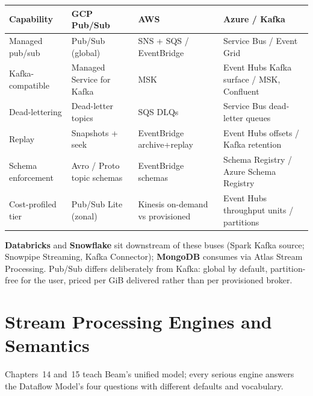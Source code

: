 \begin{center}
\footnotesize
\begin{tabular}{@{}p{2.8cm}p{3.0cm}p{3.0cm}p{3.4cm}@{}}
\toprule
\textbf{Capability} & \textbf{GCP Pub/Sub} & \textbf{AWS} & \textbf{Azure / Kafka} \\
\midrule
Managed pub/sub & Pub/Sub (global) & SNS + SQS / EventBridge & Service Bus / Event Grid \\
Kafka-compatible & Managed Service for Kafka & MSK & Event Hubs Kafka surface / MSK, Confluent \\
Dead-lettering & Dead-letter topics & SQS DLQs & Service Bus dead-letter queues \\
Replay & Snapshots + seek & EventBridge archive+replay & Event Hubs offsets / Kafka retention \\
Schema enforcement & Avro / Proto topic schemas & EventBridge schemas & Schema Registry / Azure Schema Registry \\
Cost-profiled tier & Pub/Sub Lite (zonal) & Kinesis on-demand vs provisioned & Event Hubs throughput units / partitions \\
\bottomrule
\end{tabular}
\end{center}

\noindent \textbf{Databricks} and \textbf{Snowflake} sit downstream of these buses (Spark Kafka
source; Snowpipe Streaming, Kafka Connector); \textbf{MongoDB} consumes via Atlas Stream
Processing. Pub/Sub differs deliberately from Kafka: global by default, partition-free for the
user, priced per GiB delivered rather than per provisioned broker.

\section{Stream Processing Engines and Semantics}
%
Chapters~14 and~15 teach Beam's unified model; every serious engine answers the Dataflow Model's
four questions with different defaults and vocabulary.

